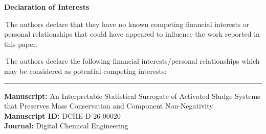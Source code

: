 \documentclass[11pt,a4paper]{article}
\newcommand{\checkedbox}{\ding{53}\kern-1.05em\raisebox{0.05ex}{$\square$}}
\newcommand{\emptybox}{$\square$}
\begin{document}
\begin{center}
{\Large\bfseries Declaration of Interests}
\end{center}

\vspace{2em}

\noindent\makebox[1.5em][l]{\checkedbox}\,The authors declare that they have no known competing financial interests or personal relationships that could have appeared to influence the work reported in this paper.

\vspace{1em}

\noindent\makebox[1.5em][l]{\emptybox}\,The authors declare the following financial interests/personal relationships which may be considered as potential competing interests:

\vspace{2em}

\noindent\rule{\textwidth}{0.4pt}

\vspace{1em}

\noindent\textbf{Manuscript:} An Interpretable Statistical Surrogate of Activated Sludge Systems that Preserves Mass Conservation and Component Non-Negativity \\[0.5em]
\textbf{Manuscript ID:} DCHE-D-26-00020 \\[0.5em]
\textbf{Journal:} Digital Chemical Engineering
\end{document}
